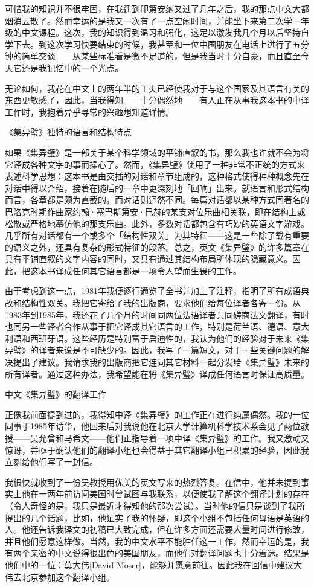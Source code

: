 \documentclass[
  12pt,
  twoside,
  openright,
  oldfontcommands,
]{memoir}
\begin{document}
可惜我的知识并不很牢固，在我迁到印第安纳又过了几年之后，我的那点中文大都烟消云散了。然而幸运的是我又一次有了一点空闲时间，并能坐下来第二次学一年级的中文课程。这次，我的知识得到温习和强化，这足以激发我几个月以后坚持自学下去。到这次学习快要结束的时候，我甚至和一位中国朋友在电话上进行了五分钟的简单交谈------从某些标准看是微不足道的，但是我当时十分自豪，而且直至今天它还是我记忆中的一个光点。

无论如何，我花在中文上的两年半的工夫已经使我对于与这个国家及其语言有关的东西更敏感了，因此，当我得知------十分偶然地------有人正在从事我这本书的中译工作时，我抱着异乎寻常的兴趣想知道详情。

{《集异璧}》独特的语言和结构特点

如果《集异璧》是一部关于某个科学领域的平铺直叙的书，那么我也许就不会为将它译成各种文字的事而操心了。然而，《集异璧》使用了一种非常不正统的方式来表述科学思想：这本书是由交插的对话和章节组成的，这种格式使得种种概念先在对话中得以介绍，接着在随后的一章中更深刻地「回响」出来。就语言和形式结构而言，各章都是颇为直截的，而对话则迥然不同。每篇对话都以某种方式同著名的巴洛克时期作曲家约翰·塞巴斯第安·巴赫的某支对位乐曲相关联，即在结构上或松散或严格地摹仿他的那支乐曲。此外，多数对话都包含有巧妙的英语文字游戏。几乎所有对话都有一个或多个「结构性双关」为其特征------这是一些除了载有重要的语义之外，还具有复杂的形式特征的段落。总之，英文《集异璧》的许多篇章在具有平铺直叙的文字内容的同时，又具有通过其结构布局所体现的隐藏意义。因此，把这本书译成任何其它语言都是一项令人望而生畏的工作。

由于考虑到这一点，1981年我便逐行通览了全书并加上了注释，指明了所有成语典故和结构性双关。我把它寄给了我的出版商，要求他们给每位译者各寄一份。从1983年到1985年，我还花了几个月的时间同两位法语译者共同磋商法文翻译，有时也同另一些译者合作从事于把它译成其它语言的工作，特别是荷兰语、德语、意大利语和西班牙语。这些经历是特别富于启迪性的，我认为他们的经验对于未来《集异璧》的译者来说是不可缺少的。因此，我写了一篇短文，对于一些关键问题的解决提出了建议。我请求我的出版商把它连同其它材料一起分发给《集异璧》未来的所有译者。通过这种办法，我希望能在将《集异璧》译成任何语言时保证高质量。

{中文《集}异璧》的翻译工作

正像我前面提到过的，我得知中译《集异璧》的工作正在进行纯属偶然。我的一位同事于1985年访华，他回来后对我说他在北京大学计算机科学技术系会见了两位教授------吴允曾和马希文------他们正指导着一项中译《集异璧》的工作。我又激动又惊讶，并亟于确认他们的翻译小组也会得益于其它翻译小组已积累的经验，因此我立刻给他们写了一封信。

我很快就收到了一份吴教授用优美的英文写来的热烈答复。在信中，他并未提到事实上他在一两年前访问美国时曾试图与我联系，以便使我了解这个翻译计划的存在（令人奇怪的是，我只是最近才得知他的那次尝试）。当时他的信只是谈到了我所提出的几个话题，比如，他证实了我的怀疑，即这个小组不包括任何母语是英语的人。他还告诉我译文的初稿已大致完成，但在许多方面还需要大量时间进行修改，并且他们愿意这样做。当然，我的中文水平不能胜任这一工作，然而幸运的是，我有两个亲密的中文说得很出色的美国朋友，而他们对翻译问题也十分着迷。结果是他们中的一位：莫大伟{[}David
Moser{]}，能够并愿意前往。因此我在回信中建议大伟去北京参加这个翻译小组。
\end{document}
